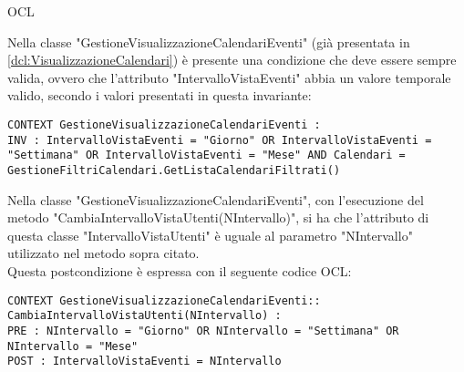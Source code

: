 \begin{listaPersonale}{OCL}
    \begin{center}
        
    \end{center}
    Nella classe "GestioneVisualizzazioneCalendariEventi" (già presentata in \ref{dcl:VisualizzazioneCalendari}) è presente una condizione che deve essere sempre valida, ovvero che l'attributo "IntervalloVistaEventi" abbia un valore temporale valido, secondo i valori presentati in questa invariante:
    \begin{lstlisting}
CONTEXT GestioneVisualizzazioneCalendariEventi :
INV : IntervalloVistaEventi = "Giorno" OR IntervalloVistaEventi = "Settimana" OR IntervalloVistaEventi = "Mese" AND Calendari = GestioneFiltriCalendari.GetListaCalendariFiltrati()
    \end{lstlisting}
    Nella classe "GestioneVisualizzazioneCalendariEventi", con l'esecuzione del metodo "CambiaIntervalloVistaUtenti(NIntervallo)", si ha che l'attributo di questa classe "IntervalloVistaUtenti" è uguale al parametro "NIntervallo" utilizzato nel metodo sopra citato. \\
    Questa postcondizione è espressa con il seguente codice OCL:
    \begin{lstlisting}
CONTEXT GestioneVisualizzazioneCalendariEventi:: CambiaIntervalloVistaUtenti(NIntervallo) :
PRE : NIntervallo = "Giorno" OR NIntervallo = "Settimana" OR NIntervallo = "Mese"
POST : IntervalloVistaEventi = NIntervallo
    \end{lstlisting}
    \newpage




\end{listaPersonale}
